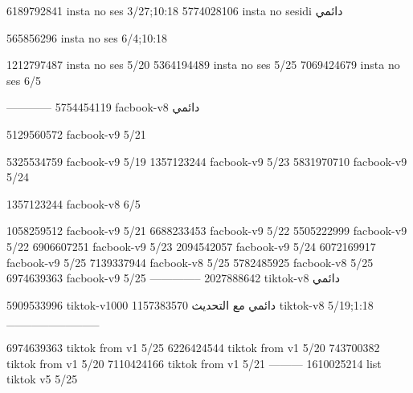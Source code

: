 
6189792841 insta no ses
3/27;10:18
5774028106 insta no sesidi
دائمي


565856296 insta no ses
6/4;10:18


1212797487 insta no ses
5/20
5364194489 insta no ses
5/25
7069424679 insta no ses
6/5

------------
5754454119 facbook-v8
دائمي

5129560572 facbook-v9
5/21

5325534759 facbook-v9
5/19
1357123244 facbook-v9
5/23
5831970710 facbook-v9
5/24

1357123244 facbook-v8
6/5

1058259512 facbook-v9
5/21
6688233453 facbook-v9
5/22
5505222999 facbook-v9
5/22
6906607251 facbook-v9
5/23
2094542057 facbook-v9
5/24
6072169917 facbook-v9
5/25
7139337944 facbook-v8
5/25
5782485925 facbook-v8
5/25
6974639363 facbook-v9
5/25
--------------
2027888642 tiktok-v8
دائمي

5909533996 tiktok-v1000
دائمي مع التحديث
1157383570 tiktok-v8
5/19;1:18
___________

6974639363 tiktok from v1
5/25
6226424544 tiktok from v1
5/20
743700382 tiktok from v1
5/20
7110424166 tiktok from v1
5/21
---------
1610025214 list tiktok v5
5/25
